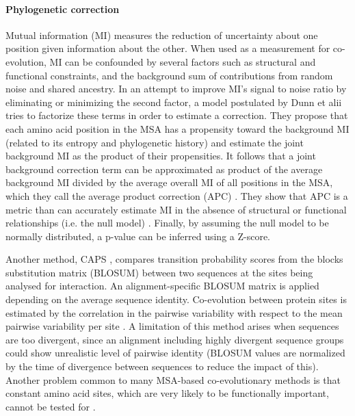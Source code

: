 \paragraph{Phylogenetic correction}
Mutual information (MI) measures the reduction of uncertainty about one position given information about the other.
When used as a measurement for co-evolution, MI can be confounded by several factors such as structural and functional constraints, and the background sum of contributions from random noise and shared ancestry.
In an attempt to improve MI's signal to noise ratio by eliminating or minimizing the second factor, a model postulated by Dunn et alii \cite{dunn2008mutual} tries to factorize these terms in order to estimate a correction.
They propose that each amino acid position in the MSA has a propensity toward the background MI (related to its entropy and phylogenetic history) and estimate the joint background MI as the product of their propensities.
It follows that a joint background correction term can be approximated as product of the average background MI divided by the average overall MI of all positions in the MSA, which they call the average product correction (APC) \cite{dunn2008mutual}.
They show that APC is a metric than can accurately estimate MI in the absence of structural or functional relationships (i.e. the null model) \cite{dunn2008mutual}.
Finally, by assuming the null model to be normally distributed, a p-value can be inferred using a Z-score.

Another method, CAPS \cite{fares2006novel}, compares transition probability scores from the blocks substitution matrix (BLOSUM) between two sequences at the sites being analysed for interaction.
An alignment-specific BLOSUM matrix is applied depending on the average sequence identity.
Co-evolution between protein sites is estimated by the correlation in the pairwise variability with respect to the mean pairwise variability per site \cite{fares2006novel}.
A limitation of this method arises when sequences are too divergent, since an alignment including highly divergent sequence groups could show unrealistic level of pairwise identity (BLOSUM values are normalized by the time of divergence between sequences to reduce the impact of this).
Another problem common to many MSA-based co-evolutionary methods is that constant amino acid sites, which are very likely to be functionally important, cannot be tested for  \cite{fares2006novel}.

